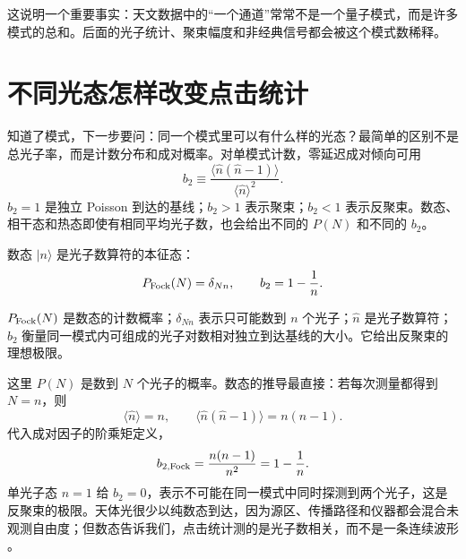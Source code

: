 这说明一个重要事实：天文数据中的“一个通道”常常不是一个量子模式，而是许多模式的总和。后面的光子统计、聚束幅度和非经典信号都会被这个模式数稀释。

\section{不同光态怎样改变点击统计}

知道了模式，下一步要问：同一个模式里可以有什么样的光态？最简单的区别不是总光子率，而是计数分布和成对概率。对单模式计数，零延迟成对倾向可用
\[
  b_2\equiv
  \frac{\langle \hat n(\hat n-1)\rangle}{\langle\hat n\rangle^2}.
\]
\(b_2=1\) 是独立 Poisson 到达的基线；\(b_2>1\) 表示聚束；\(b_2<1\) 表示反聚束。数态、相干态和热态即使有相同平均光子数，也会给出不同的 \(P(N)\) 和不同的 \(b_2\)。

数态 \(|n\rangle\) 是光子数算符的本征态：
\begin{equation}
  P_{\rm Fock}(N)=\delta_{Nn},\qquad
  b_2=1-\frac{1}{n}.
  \label{eq:ch03-fock}
\end{equation}
\begin{formulaexplain}
\(P_{\rm Fock}(N)\) 是数态的计数概率；\(\delta_{Nn}\) 表示只可能数到 \(n\) 个光子；\(\hat n\) 是光子数算符；\(b_2\) 衡量同一模式内可组成的光子对数相对独立到达基线的大小。它给出反聚束的理想极限。
\end{formulaexplain}
这里 \(P(N)\) 是数到 \(N\) 个光子的概率。数态的推导最直接：若每次测量都得到 \(N=n\)，则
\[
  \langle \hat n\rangle=n,
  \qquad
  \langle \hat n(\hat n-1)\rangle=n(n-1).
\]
代入成对因子的阶乘矩定义，
\[
  b_{2,{\rm Fock}}
  =
  \frac{n(n-1)}{n^2}
  =
  1-\frac{1}{n}.
\]
单光子态 \(n=1\) 给 \(b_2=0\)，表示不可能在同一模式中同时探测到两个光子，这是反聚束的极限。天体光很少以纯数态到达，因为源区、传播路径和仪器都会混合未观测自由度；但数态告诉我们，点击统计测的是光子数相关，而不是一条连续波形 \citep{1977PhRvL..39..691K,1979OptL....4..205M,1998RvMP...70..101P}。


